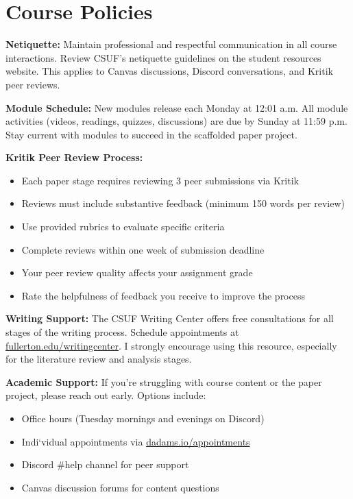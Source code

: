 \documentclass[12pt]{article}     %
\begin{document}
\section{Course Policies}

\noindent \textbf{Netiquette:} Maintain professional and respectful communication in all course interactions. Review CSUF's netiquette guidelines on the student resources website. This applies to Canvas discussions, Discord conversations, and Kritik peer reviews.

\vspace{0.5em}
\noindent \textbf{Module Schedule:} New modules release each Monday at 12:01 a.m. All module activities (videos, readings, quizzes, discussions) are due by Sunday at 11:59 p.m. Stay current with modules to succeed in the scaffolded paper project.

\vspace{0.5em}
\noindent \textbf{Kritik Peer Review Process:} 
\begin{itemize}
\item Each paper stage requires reviewing 3 peer submissions via Kritik
\item Reviews must include substantive feedback (minimum 150 words per review)
\item Use provided rubrics to evaluate specific criteria
\item Complete reviews within one week of submission deadline
\item Your peer review quality affects your assignment grade
\item Rate the helpfulness of feedback you receive to improve the process
\end{itemize}

\vspace{0.5em}
\noindent \textbf{Writing Support:} The CSUF Writing Center offers free consultations for all stages of the writing process. Schedule appointments at \href{http://www.fullerton.edu/writingcenter/}{fullerton.edu/writingcenter}. I strongly encourage using this resource, especially for the literature review and analysis stages.

\vspace{0.5em}
\noindent \textbf{Academic Support:} If you're struggling with course content or the paper project, please reach out early. Options include:
\begin{itemize}
\item Office hours (Tuesday mornings and evenings on Discord)
\item Indi`vidual appointments via \href{https://dadams.io/appointments}{dadams.io/appointments}
\item Discord \#help channel for peer support
\item Canvas discussion forums for content questions
\end{itemize}
\end{document}
